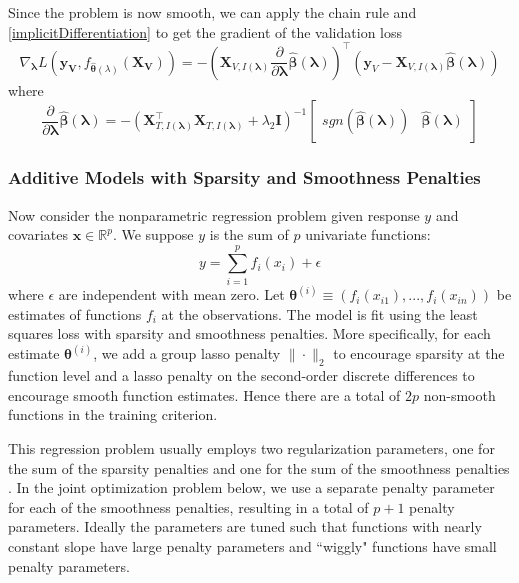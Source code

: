 \documentclass[12pt]{article}
\begin{document}
Since the problem is now smooth, we can apply the chain rule and \eqref{implicitDifferentiation} to get the gradient of the validation loss
\begin{equation}
\nabla_{\boldsymbol \lambda} L(\boldsymbol{y_V}, f_{\hat{\boldsymbol{\theta}}(\lambda)}(\boldsymbol{X_V})) =
- \left (
\boldsymbol{X}_{V, I(\boldsymbol\lambda)}
\frac{\partial}{\partial \boldsymbol \lambda} \hat{\boldsymbol{\beta}}(\boldsymbol{\lambda})
\right )^{\top}
\left (
\boldsymbol y_V - \boldsymbol{X}_{V, I(\boldsymbol\lambda)} \hat{\boldsymbol{\beta}} (\boldsymbol{\lambda})
\right )
\end{equation}
where
\begin{equation}
\frac{\partial}{\partial \boldsymbol \lambda} \hat{\boldsymbol{\beta}}(\boldsymbol{\lambda}) = 
- \left ( 
\boldsymbol{X}_{T, I(\boldsymbol\lambda)}^\top \boldsymbol{X}_{T, I(\boldsymbol\lambda)} + \lambda_2 \boldsymbol{I}
\right )^{-1}
\begin{bmatrix}
sgn \left (\hat{\boldsymbol{\beta}} (\boldsymbol{\lambda}) \right ) &
\hat{\boldsymbol{\beta}} (\boldsymbol{\lambda})
\end{bmatrix}
\end{equation}

\subsubsection{Additive Models with Sparsity and Smoothness Penalties}\label{sec:additive}

Now consider the nonparametric regression problem given response $y$ and covariates $\boldsymbol{x} \in \mathbb{R}^p$. We suppose $y$ is the sum of $p$ univariate functions:
\begin{equation}
y = \sum_{i=1}^p f_i(x_i) + \epsilon
\end{equation}
where $\epsilon$ are independent with mean zero.
Let $\boldsymbol{\theta}^{(i)} \equiv (f_i(x_{i1}), ..., f_i(x_{in}))$ be estimates of functions $f_i$ at the observations. The model is fit using the least squares loss with sparsity and smoothness penalties. More specifically, for each estimate $\boldsymbol{\theta}^{(i)}$, we add a group lasso penalty $\| \cdot \|_2$ to encourage sparsity at the function level and a lasso penalty on the second-order discrete differences to encourage smooth function estimates. Hence there are a total of $2p$ non-smooth functions in the training criterion.

This regression problem usually employs two regularization parameters, one for the sum of the sparsity penalties and one for the sum of the smoothness penalties \citep{buhlmann2011statistics}. In the joint optimization problem below, we use a separate penalty parameter for each of the smoothness penalties, resulting in a total of $p+1$ penalty parameters. Ideally the parameters are tuned such that functions with nearly constant slope have large penalty parameters and ``wiggly" functions have small penalty parameters.
\end{document}
